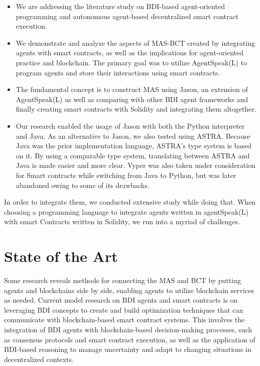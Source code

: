 \begin{itemize}
    \item We are addressing the literature study on \ac{BDI}-based agent-oriented programming and autonomous agent-based decentralized smart contract execution.

    \item We demonstrate and analyze the aspects of \ac{MAS}-\ac{BCT} created by integrating agents with smart contracts, as well as the implications for agent-oriented practice and blockchain. The primary goal was to utilize AgentSpeak(L) to program agents and store their interactions using smart contracts.
    
\vspace{.5cm}

    \item  The fundamental concept is to construct \ac{MAS} using Jason, an extension of AgentSpeak(L) as well as comparing with other \ac{BDI} agent frameworks and finally creating smart contracts with Solidity and integrating them altogether.
    
\vspace{.5cm}

    \item Our research enabled the usage of Jason with both the Python interpreter and Java. As an alternative to Jason, we also tested using ASTRA. Because Java was the prior implementation language, ASTRA's type system is based on it. By using a comparable type system, translating between ASTRA and Java is made easier and more clear. Vyper was also taken under consideration for Smart contracts while switching from Java to Python, but was later abandoned owing to some of its drawbacks.
    
\vspace{.5cm}

\end{itemize}

In order to integrate them, we conducted extensive study while doing that. When choosing a programming language to integrate agents written in agentSpeak(L) with smart Contracts written in Solidity, we run into a myriad of challenges.

\section{State of the Art}

Some research reveals methods for connecting the \ac{MAS} and \ac{BCT} by putting agents and blockchains side by side, enabling agents to utilize blockchain services as needed. Current model research on \ac{BDI} agents and smart contracts is on leveraging \ac{BDI} concepts to create and build optimization techniques that can communicate with blockchain-based smart contract systems. This involves the integration of \ac{BDI} agents with blockchain-based decision-making processes, such as consensus protocols and smart contract execution, as well as the application of \ac{BDI}-based reasoning to manage uncertainty and adapt to changing situations in decentralized contexts.

